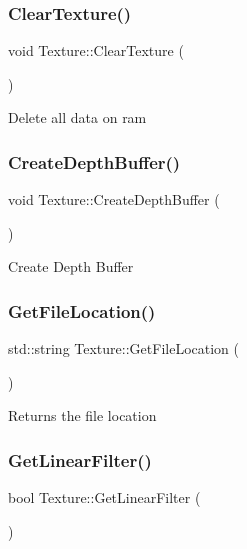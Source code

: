 \subsubsection{\texorpdfstring{ClearTexture()}{ClearTexture()}}
{\footnotesize\ttfamily void Texture\+::\+Clear\+Texture (\begin{DoxyParamCaption}{ }\end{DoxyParamCaption})}

Delete all data on ram \mbox{\label{class_texture_a59cc35d4badabf3181f45a5005417ddd}} 
\subsubsection{\texorpdfstring{CreateDepthBuffer()}{CreateDepthBuffer()}}
{\footnotesize\ttfamily void Texture\+::\+Create\+Depth\+Buffer (\begin{DoxyParamCaption}{ }\end{DoxyParamCaption})}

Create Depth Buffer \mbox{\label{class_texture_a9956df46cb20493fa24bd9832a271e19}} 
\subsubsection{\texorpdfstring{GetFileLocation()}{GetFileLocation()}}
{\footnotesize\ttfamily std\+::string Texture\+::\+Get\+File\+Location (\begin{DoxyParamCaption}{ }\end{DoxyParamCaption})}

Returns the file location \mbox{\label{class_texture_a40e37f9e62a3e17e5b8ffbf8d6a91d2e}} 
\subsubsection{\texorpdfstring{GetLinearFilter()}{GetLinearFilter()}}
{\footnotesize\ttfamily bool Texture\+::\+Get\+Linear\+Filter (\begin{DoxyParamCaption}{ }\end{DoxyParamCaption})}

